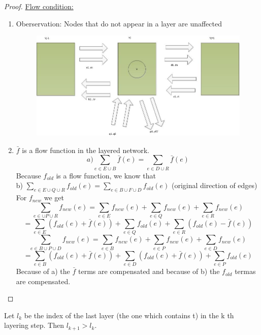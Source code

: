 \begin{proof}
\underline{Flow condition:} \\
\begin{enumerate}
\item Oberservation: Nodes that do not appear in a layer are unaffected
\begin{figure}[h!]
\centering
\includegraphics[width=\textwidth]{diagrams/Chapter3_Proof8.jpg} 
\end{figure}
\item $\bar{f}$ is a flow function in the layered network. 
\[ a) \sum_{e \in E \cup B}\bar{f}(e) = \sum_{e \in D \cup R}\bar{f}(e)\]
Because $f_{old}$ is a flow function, we know that \\
b) $\sum_{e \in E \cup Q \cup R}f_{old}(e) = \sum_{e \in B \cup F \cup D}f_{old}(e)$ (original direction of edges) \\
For $f_{new}$ we get 
\[\sum_{e \in  \cup P \cup R} f_{new}(e) = \sum_{e \in E}f_{new}(e) + \sum_{e \in Q}f_{new}(e) + \sum_{e \in R}f_{new}(e)\]
\[= \sum_{e \in E}(f_{old}(e)  + \bar{f}(e)) + \sum_{e \in Q}f_{old}(e) + \sum_{e \in R}(f_{old}(e) - \bar{f}(e))\]
\[\sum_{e \in B \cup P \cup D}f_{new}(e) = \sum_{e \in B}f_{new}(e) + \sum_{e \in P}f_{new}(e) + \sum_{e \in D}f_{new}(e)\]
\[= \sum_{e \in B}(f_{old}(e) + \bar{f}(e)) + \sum_{e \in D}(f_{old}(e) + \bar{f}(e)) + \sum_{e \in P}f_{old}(e)\]
Because of a) the $\bar{f}$ terms are compensated and because of b) the $f_{old}$ termas are compensated.
\end{enumerate}
\end{proof}

\begin{lemma}
Let $l_k$ be the index of the last layer (the one which contains t) in the k th layering step. Then $l_{k+1} > l_k$.
\end{lemma}

